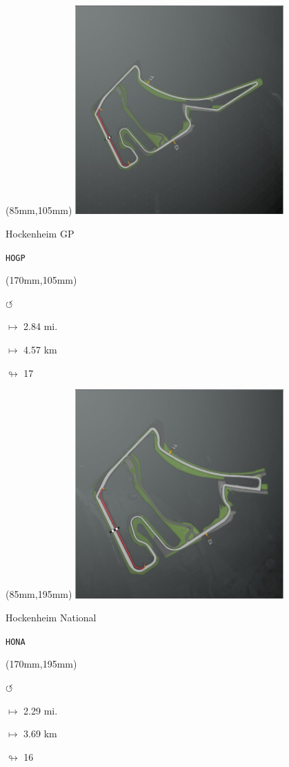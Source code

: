 \begin{textblock*}{80mm}(85mm,105mm)%
\includegraphics[width=80mm]{TR/2015-05-20_00027.png}
\centerline{Hockenheim GP}
\par\hfill\tiny\tt HOGP\\
\end{textblock*}
\begin{textblock*}{30mm}(170mm,105mm)%
\par \Huge$\circlearrowleft$
\Large
\par$\mapsto$ 2.84 mi.
\par$\mapsto$ 4.57 km
\par$\looparrowright$ 17
\end{textblock*}
\begin{textblock*}{80mm}(85mm,195mm)%
\includegraphics[width=80mm]{TR/2015-05-20_00028.png}
\centerline{Hockenheim National}
\par\hfill\tiny\tt HONA\\
\end{textblock*}
\begin{textblock*}{30mm}(170mm,195mm)%
\par \Huge$\circlearrowleft$
\Large
\par$\mapsto$ 2.29 mi.
\par$\mapsto$ 3.69 km
\par$\looparrowright$ 16
\end{textblock*}
\null\newpage

